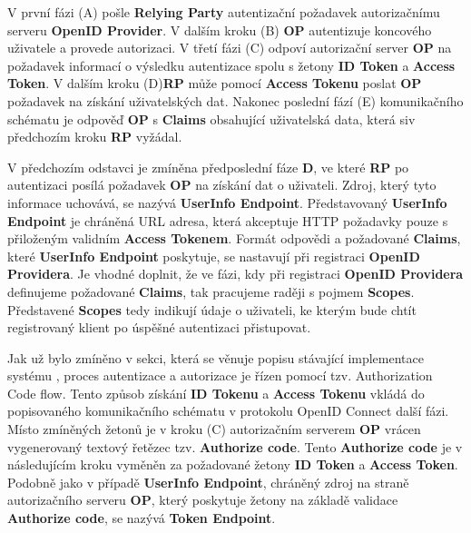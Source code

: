 \documentclass[
  printed, %
  twoside, %
  table,   %
  nolof,     %
  nolot,     %
]{fithesis3}
\begin{document}
V první fázi (A) pošle \textbf{Relying Party} autentizační požadavek autorizačnímu serveru \textbf{OpenID Provider}. V dalším kroku (B) \textbf{OP} autentizuje koncového uživatele a provede autorizaci. V třetí fázi (C) odpoví autorizační server \textbf{OP} na požadavek informací o výsledku autentizace spolu s žetony \textbf{ID Token} a \textbf{Access Token}. V dalším kroku (D)\break \textbf{RP} může pomocí \textbf{Access Tokenu} poslat \textbf{OP} požadavek na získání uživatelských dat. Nakonec poslední fází (E) komunikačního schématu je odpověď \textbf{OP} s \textbf{Claims} obsahující uživatelská data, která si\break v předchozím kroku \textbf{RP} vyžádal. 
\par

V předchozím odstavci je zmíněna předposlední fáze \textbf{D}, ve které \textbf{RP} po autentizaci posílá požadavek \textbf{OP} na získání dat o uživateli. Zdroj, který tyto informace uchovává, se nazývá \textbf{UserInfo Endpoint}. Představovaný \textbf{UserInfo Endpoint} je chráněná URL adresa, která akceptuje HTTP požadavky pouze s přiloženým validním \textbf{Access Tokenem}. Formát odpovědi a požadované \textbf{Claims}, které \textbf{UserInfo Endpoint} poskytuje, se nastavují při registraci \textbf{OpenID Providera}. Je vhodné doplnit, že ve fázi, kdy při registraci \textbf{OpenID Providera} definujeme požadované \textbf{Claims}, tak pracujeme raději s pojmem \textbf{Scopes}. Představené \textbf{Scopes} tedy indikují údaje o uživateli, ke kterým bude chtít registrovaný klient po úspěšné autentizaci přistupovat.
\par

Jak už bylo zmíněno v sekci, která se věnuje popisu stávající implementace systému , proces autentizace a autorizace je řízen pomocí tzv. Authorization Code flow. Tento způsob získání \textbf{ID Tokenu} a \textbf{Access Tokenu} vkládá do popisovaného komunikačního schématu v protokolu OpenID Connect další fázi. Místo zmíněných žetonů je v kroku (C) autorizačním serverem \textbf{OP} vrácen vygenerovaný textový řetězec tzv. \textbf{Authorize code}. Tento \textbf{Authorize code} je v následujícím kroku vyměněn za požadované žetony \textbf{ID Token} a \textbf{Access Token}. Podobně jako v případě \textbf{UserInfo Endpoint}, chráněný zdroj na straně autorizačního serveru \textbf{OP}, který poskytuje žetony na základě validace \textbf{Authorize code}, se nazývá \textbf{Token Endpoint}.
\end{document}
